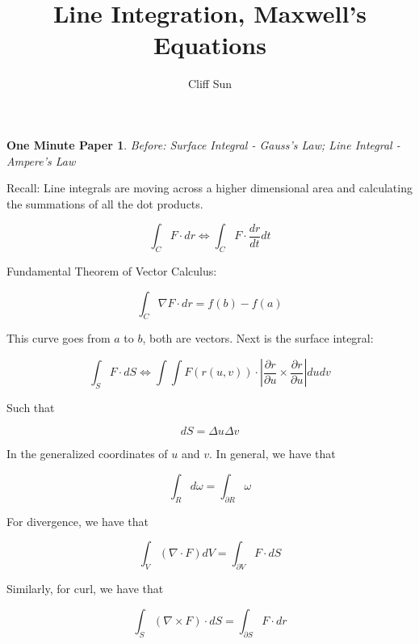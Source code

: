 \documentclass{article}
\title{Line Integration, Maxwell's Equations}
\author{Cliff Sun}
\newtheorem{one minute paper}[theorem]{One Minute Paper}
\begin{document}
\maketitle

\begin{one minute paper}
    Before: Surface Integral - Gauss's Law; Line Integral - Ampere's Law
\end{one minute paper}

Recall: Line integrals are moving across a higher dimensional area and calculating the summations 
of all the dot products. 

\begin{equation}
    \int_{C}F \cdot dr \iff \int_{C}F \cdot \frac{dr}{dt}dt
\end{equation}

Fundamental Theorem of Vector Calculus:

\begin{equation}
    \int_{C}\nabla F \cdot dr = f(b) - f(a)
\end{equation}

This curve goes from $a$ to $b$, both are vectors. Next is the surface integral:

\begin{equation}
    \int_{S} F \cdot dS \iff \int\int F(r(u,v)) \cdot |\frac{\partial r}{\partial u} \times \frac{\partial r}{\partial u}|dudv
\end{equation}

Such that 

\begin{equation}
    dS = \Delta u \Delta v
\end{equation}

In the generalized coordinates of $u$ and $v$. In general, we have that 

\begin{equation}
    \int_{R}d\omega = \int_{\partial R}\omega
\end{equation}

For divergence, we have that

\begin{equation}
    \int_V (\nabla \cdot F)dV = \int_{\partial V}F \cdot dS
\end{equation}

Similarly, for curl, we have that

\begin{equation}
    \int_S (\nabla \times F) \cdot dS = \int_{\partial S} F \cdot dr
\end{equation}
\end{document}
